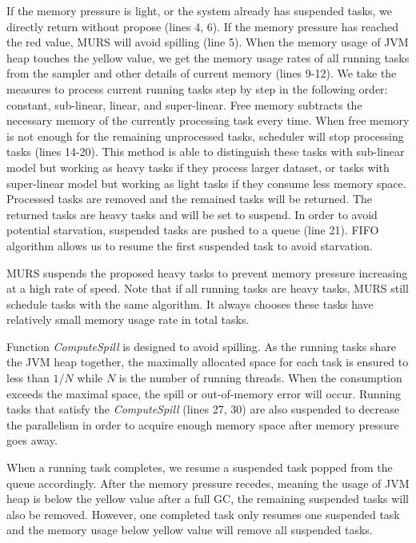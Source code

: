 If the memory pressure is light, or the system already has suspended tasks, we directly return without propose (lines 4, 6). If the memory pressure has reached the red value, MURS will avoid spilling (line 5). When the memory usage of JVM heap touches the yellow value, we get the memory usage rates of all running tasks from the sampler and other details of current memory (lines 9-12). We take the measures to process current running tasks step by step in the following order: constant, sub-linear, linear, and super-linear. Free memory subtracts the necessary memory of the currently processing task every time. When free memory is not enough for the remaining unprocessed tasks, scheduler will stop processing tasks (lines 14-20). This method is able to distinguish these tasks with sub-linear model but working as heavy tasks if they process larger dataset, or tasks with super-linear model but working as light tasks if they consume less memory space. Processed tasks are removed and the remained tasks will be returned. The returned tasks are heavy tasks and will be set to suspend. In order to avoid potential starvation, suspended tasks are pushed to a queue (line 21). FIFO algorithm allows us to resume the first suspended task to avoid starvation. 

MURS suspends the proposed heavy tasks to prevent memory pressure increasing at a high rate of speed. Note that if all running tasks are heavy tasks, MURS still schedule tasks with the same algorithm. It always chooses these tasks have relatively small memory usage rate in total tasks. 

Function \textit{ComputeSpill} is designed to avoid spilling. As the running tasks share the JVM heap together, the maximally allocated space for each task is ensured to less than $1/N$ while $N$ is the number of running threads. When the consumption exceeds the maximal space, the spill or out-of-memory error will occur. Running tasks that satisfy the \textit{ComputeSpill} (lines 27, 30) are also suspended to decrease the parallelism in order to acquire enough memory space after memory pressure goes away.   

When a running task completes, we resume a suspended task popped from the queue accordingly. After the memory pressure recedes, meaning the usage of JVM heap is below the yellow value after a full GC, the remaining suspended tasks will also be removed. However, one completed task only resumes one suspended task and the memory usage below yellow value will remove all suspended tasks.